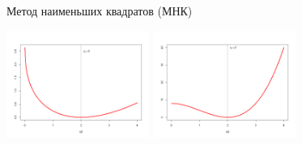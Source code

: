 \documentclass[9pt,pdf,utf8,hyperref={unicode},aspectratio=169]{beamer}
\begin{document}
\begin{frame}{Метод наименьших квадратов (МНК)}
{	\begin{center}
		\includegraphics[width=0.35\textwidth]{db1.png}
		\includegraphics[width=0.35\textwidth]{db2.png}
	\end{center}		
}
\end{frame}
\end{document}

